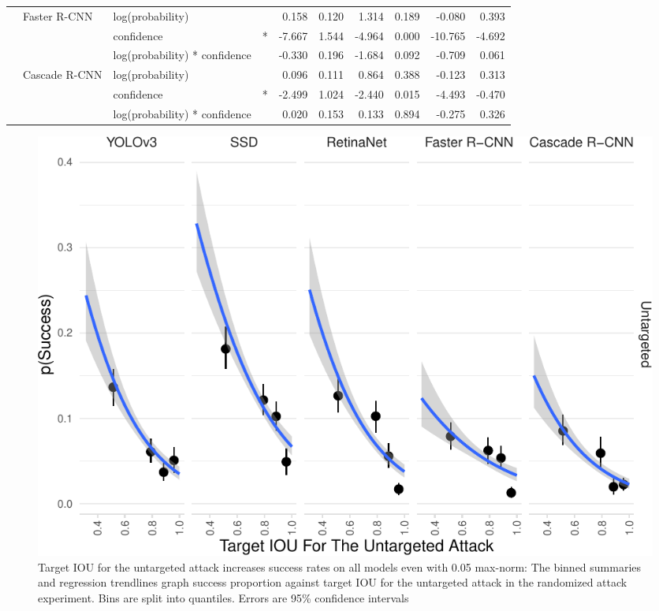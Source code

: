 \documentclass[
]{article}
\begin{document}
\begin{longtable}[t]{llllrrrrrr}
\cmidrule{2-10}\nopagebreak
\hspace{1em} & Faster R-CNN & log(probability) &  & 0.158 & 0.120 & 1.314 & 0.189 & -0.080 & 0.393\\
\cmidrule{3-10}\nopagebreak
\hspace{1em} &  & confidence & * & -7.667 & 1.544 & -4.964 & 0.000 & -10.765 & -4.692\\
\cmidrule{3-10}\nopagebreak
\hspace{1em} &  & log(probability) * confidence &  & -0.330 & 0.196 & -1.684 & 0.092 & -0.709 & 0.061\\
\cmidrule{2-10}\nopagebreak
\hspace{1em} & Cascade R-CNN & log(probability) &  & 0.096 & 0.111 & 0.864 & 0.388 & -0.123 & 0.313\\
\cmidrule{3-10}\nopagebreak
\hspace{1em} &  & confidence & * & -2.499 & 1.024 & -2.440 & 0.015 & -4.493 & -0.470\\
\cmidrule{3-10}\nopagebreak
\hspace{1em} &  & log(probability) * confidence &  & 0.020 & 0.153 & 0.133 & 0.894 & -0.275 & 0.326\\
\bottomrule
\end{longtable}
\endgroup{}

\begin{figure}[tb]

{\centering \includegraphics{imgs-normed/untarget_iou_graph-1} 

}

\caption{Target IOU for the untargeted attack increases success rates on all models even with 0.05 max-norm:  The binned summaries and regression trendlines graph success proportion against target IOU for the untargeted attack in the randomized attack experiment. Bins are split into quantiles. Errors are 95\% confidence intervals}\label{fig:untarget_iou_graph}
\end{figure}
\end{document}
